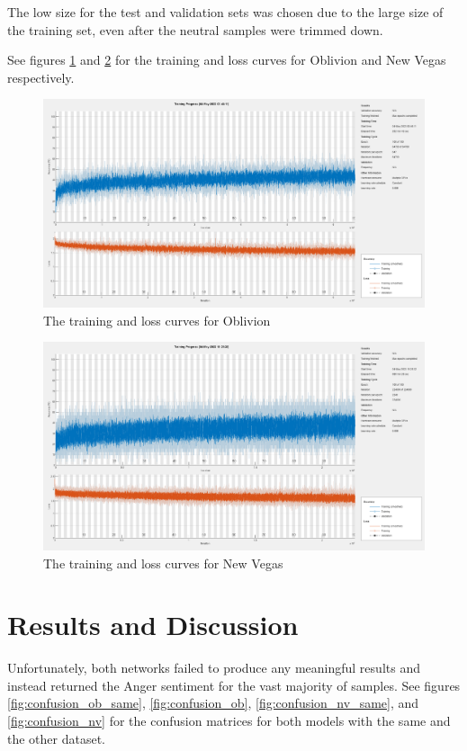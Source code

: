 \documentclass[journal]{IEEEtran}
\begin{document}
The low size for the test and validation sets was chosen due to the large size of the training set,
even after the neutral samples were trimmed down.

See figures \ref{fig:training_ob} and \ref{fig:training_nv} for the training and loss curves for
Oblivion and New Vegas respectively.

\begin{figure}
    \includegraphics[width=\columnwidth]{src/out/training_ob.png}
    \caption{The training and loss curves for Oblivion}
    \label{fig:training_ob}
\end{figure}

\begin{figure}
    \includegraphics[width=\columnwidth]{src/out/training_nv.png}
    \caption{The training and loss curves for New Vegas}
    \label{fig:training_nv}
\end{figure}

\section{Results and Discussion}
Unfortunately, both networks failed to produce any meaningful results and instead returned
the Anger sentiment for the vast majority of samples. See figures \ref{fig:confusion_ob_same},
\ref{fig:confusion_ob}, \ref{fig:confusion_nv_same}, and \ref{fig:confusion_nv} for
the confusion matrices for both models with the same and the other dataset.
\end{document}
